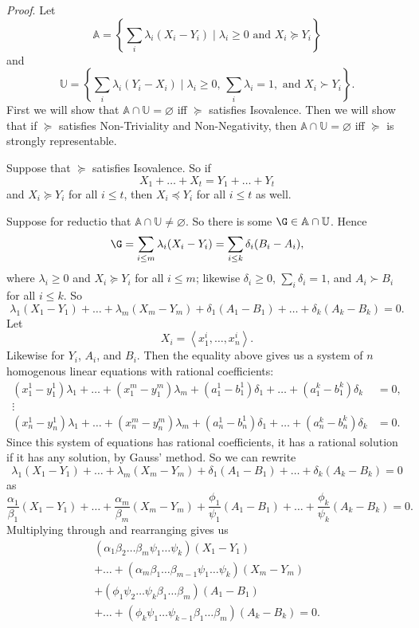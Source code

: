 \noindent\textit{Proof}. Let 
$$ \mathbb{A}=\left\{\sum_i \lambda_i(X_i-Y_i) \mathrel{|} \lambda_i\geq0 \text{ and } X_i\succeq Y_i\right\} $$
and
$$ \displaystyle\mathbb{U}=\left\{\sum_i \lambda_i(Y_i-X_i) \mathrel{|} \lambda_i\geq0,\, \sum_i\lambda_i=1, \text{ and } X_i\succ Y_i\right\}. $$
First we will show that $\mathbb{A}\cap\mathbb{U}=\varnothing$ iff $\succeq$ satisfies Isovalence. Then we will show that if $\succeq$ satisfies Non-Triviality and Non-Negativity, then $\mathbb{A}\cap\mathbb{U}=\varnothing$ iff $\succeq$ is strongly representable.

Suppose that $\succeq$ satisfies Isovalence. So if
$$ X_1+\ldots+X_t=Y_1+\ldots+Y_t $$
and $X_i\succeq Y_i$ for all $i\leq t$, then $X_i\preceq Y_i$ for all $i\leq t$ as well.

Suppose for reductio that $\mathbb{A}\cap\mathbb{U}\not=\varnothing$. So there is some $\G\in\mathbb{A}\cap\mathbb{U}$. Hence
$$ \G=\sum_{i\leq m} \lambda_i(X_i-Y_i)=\sum_{i\leq k} \delta_i(B_i-A_i), $$
where $\lambda_i\geq0$ and $X_i\succeq Y_i$ for all $i\leq m$; likewise $\delta_i\geq0$, $\sum_i\delta_i=1$, and $A_i\succ B_i$ for all $i\leq k$. So
$$\lambda_1(X_1-Y_1)+\hdots+\lambda_m(X_m-Y_m) +\delta_1(A_1-B_1)+\hdots+\delta_k(A_k-B_k)=0. $$
Let 
$$ X_i=\left<x^i_1,\hdots,x^i_n\right>. $$
Likewise for $Y_i$, $A_i$, and $B_i$. Then the equality above gives us a system of $n$ homogenous linear equations with rational coefficients:
$$
\begin{aligned}
(x^1_1-y^1_1)\lambda_1+\hdots+(x^m_1-y^m_1)\lambda_m+ (a^1_1-b^1_1)\delta_1+\hdots+(a^k_1-b^k_1)\delta_k &= 0,\\
\vdots\hspace{13em}&\\
(x^1_n-y^1_n)\lambda_1+\hdots+(x^m_n-y^m_n)\lambda_m+(a^1_n-b^1_n)\delta_1+\hdots+(a^k_n-b^k_n)\delta_k&=0.
\end{aligned}
$$
Since this system of equations has rational coefficients, it has a rational solution if it has any solution, by Gauss' method. So we can rewrite
$$\lambda_1(X_1-Y_1)+\hdots+\lambda_m(X_m-Y_m)+\delta_1(A_1-B_1)+\hdots+\delta_k(A_k-B_k)=0$$
as
$$\frac{\alpha_1}{\beta_1}(X_1-Y_1)+\hdots+\frac{\alpha_m}{\beta_m}(X_m-Y_m)+\frac{\phi_1}{\psi_1}(A_1-B_1)+\hdots+\frac{\phi_k}{\psi_k}(A_k-B_k)=0.$$
Multiplying through and rearranging gives us
\begin{multline*}
(\alpha_1\beta_2\hdots\beta_m\psi_1\hdots\psi_k)(X_1-Y_1)\\
  +\ldots+(\alpha_m\beta_1\hdots\beta_{m-1}\psi_1\hdots\psi_k)(X_m-Y_m)\\
	+(\phi_1\psi_2\hdots\psi_k\beta_1\hdots\beta_m)(A_1-B_1)\\
	+\ldots+(\phi_k\psi_1\hdots\psi_{k-1}\beta_1\hdots\beta_m)(A_k-B_k)=0.
\end{multline*}
